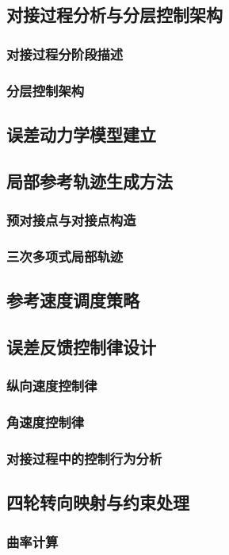 \documentclass{article}
\begin{document}
\subsection{对接过程分析与分层控制架构}
\subsubsection{对接过程分阶段描述}
\subsubsection{分层控制架构}
\subsection{误差动力学模型建立}
\subsection{局部参考轨迹生成方法}
\subsubsection{预对接点与对接点构造}
\subsubsection{三次多项式局部轨迹}
\subsection{参考速度调度策略}
\subsection{误差反馈控制律设计}
\subsubsection{纵向速度控制律}
\subsubsection{角速度控制律}
\subsubsection{对接过程中的控制行为分析}
\subsection{四轮转向映射与约束处理}
\subsubsection{曲率计算}
\end{document}
